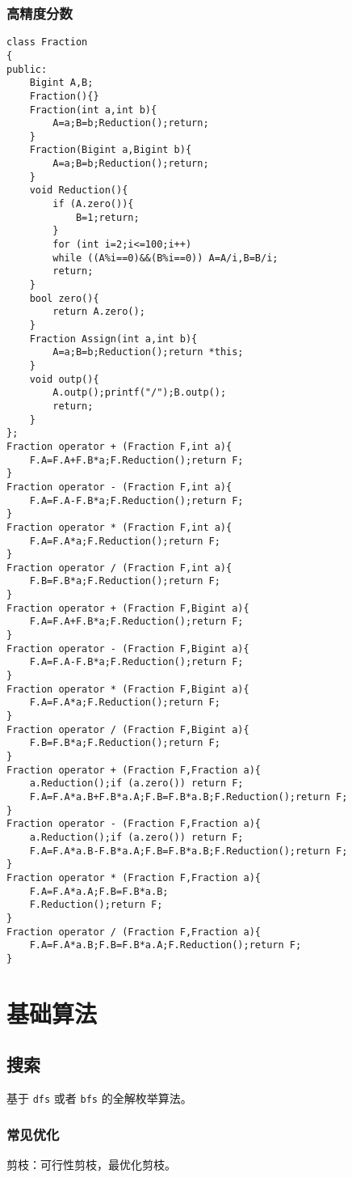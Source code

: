 \documentclass[UTF-8]{ctexart}
\begin{document}
	\subsubsection{高精度分数}
\begin{verbatim}
class Fraction
{
public:
    Bigint A,B;
    Fraction(){}
    Fraction(int a,int b){
        A=a;B=b;Reduction();return;
    }
    Fraction(Bigint a,Bigint b){
        A=a;B=b;Reduction();return;
    }
    void Reduction(){
        if (A.zero()){
            B=1;return;
        }
        for (int i=2;i<=100;i++)
        while ((A%i==0)&&(B%i==0)) A=A/i,B=B/i;
        return;
    }
    bool zero(){
        return A.zero();
    }
    Fraction Assign(int a,int b){
        A=a;B=b;Reduction();return *this;
    }
    void outp(){
        A.outp();printf("/");B.outp();
        return;
    }
};
Fraction operator + (Fraction F,int a){
    F.A=F.A+F.B*a;F.Reduction();return F;
}
Fraction operator - (Fraction F,int a){
    F.A=F.A-F.B*a;F.Reduction();return F;
}
Fraction operator * (Fraction F,int a){
    F.A=F.A*a;F.Reduction();return F;
}
Fraction operator / (Fraction F,int a){
    F.B=F.B*a;F.Reduction();return F;
}
Fraction operator + (Fraction F,Bigint a){
    F.A=F.A+F.B*a;F.Reduction();return F;
}
Fraction operator - (Fraction F,Bigint a){
    F.A=F.A-F.B*a;F.Reduction();return F;
}
Fraction operator * (Fraction F,Bigint a){
    F.A=F.A*a;F.Reduction();return F;
}
Fraction operator / (Fraction F,Bigint a){
    F.B=F.B*a;F.Reduction();return F;
}
Fraction operator + (Fraction F,Fraction a){
    a.Reduction();if (a.zero()) return F;
    F.A=F.A*a.B+F.B*a.A;F.B=F.B*a.B;F.Reduction();return F;
}
Fraction operator - (Fraction F,Fraction a){
    a.Reduction();if (a.zero()) return F;
    F.A=F.A*a.B-F.B*a.A;F.B=F.B*a.B;F.Reduction();return F;
}
Fraction operator * (Fraction F,Fraction a){
    F.A=F.A*a.A;F.B=F.B*a.B;
    F.Reduction();return F;
}
Fraction operator / (Fraction F,Fraction a){
    F.A=F.A*a.B;F.B=F.B*a.A;F.Reduction();return F;
}
\end{verbatim}
	\newpage
	\section{基础算法}
	\subsection{搜索}
	基于 \texttt{dfs} 或者 \texttt{bfs} 的全解枚举算法。
	
	\subsubsection{常见优化}
	剪枝：可行性剪枝，最优化剪枝。
	
\end{document}
